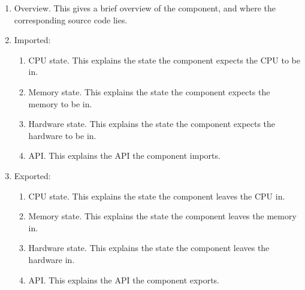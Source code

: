 \documentclass[11pt,a4paper,oneside]{report}
\begin{document}
\begin{enumerate}
    \item Overview. This gives a brief overview of the component, and where the corresponding source code lies.
    \item Imported:\\
        \begin{enumerate}
            \item CPU state. This explains the state the component expects the CPU to be in.
            \item Memory state. This explains the state the component expects the memory to be in.
            \item Hardware state. This explains the state the component expects the hardware to be in.
            \item API. This explains the API the component imports.
        \end{enumerate}
    \item Exported:\\
        \begin{enumerate}
            \item CPU state. This explains the state the component leaves the CPU in.
            \item Memory state. This explains the state the component leaves the memory in.
            \item Hardware state. This explains the state the component leaves the hardware in.
            \item API. This explains the API the component exports.
        \end{enumerate}
\end{enumerate}
\end{document}
